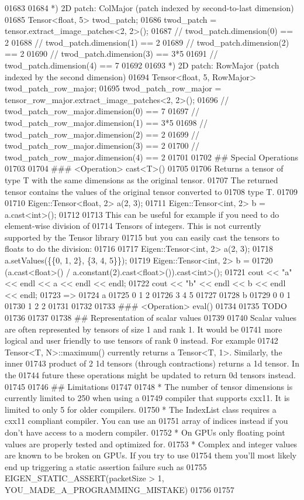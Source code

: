 \begin{DoxyCode}
01683 
01684 *) 2D patch: ColMajor (patch indexed by second-to-last dimension)
01685   Tensor<float, 5> twod\_patch;
01686   twod\_patch = tensor.extract\_image\_patches<2, 2>();
01687   // twod\_patch.dimension(0) == 2
01688   // twod\_patch.dimension(1) == 2
01689   // twod\_patch.dimension(2) == 2
01690   // twod\_patch.dimension(3) == 3*5
01691   // twod\_patch.dimension(4) == 7
01692 
01693 *) 2D patch: RowMajor (patch indexed by the second dimension)
01694   Tensor<float, 5, RowMajor> twod\_patch\_row\_major;
01695   twod\_patch\_row\_major = tensor\_row\_major.extract\_image\_patches<2, 2>();
01696   // twod\_patch\_row\_major.dimension(0) == 7
01697   // twod\_patch\_row\_major.dimension(1) == 3*5
01698   // twod\_patch\_row\_major.dimension(2) == 2
01699   // twod\_patch\_row\_major.dimension(3) == 2
01700   // twod\_patch\_row\_major.dimension(4) == 2
01701 
01702 ## Special Operations
01703 
01704 ### <Operation> cast<T>()
01705 
01706 Returns a tensor of type T with the same dimensions as the original tensor.
01707 The returned tensor contains the values of the original tensor converted to
01708 type T.
01709 
01710     Eigen::Tensor<float, 2> a(2, 3);
01711     Eigen::Tensor<int, 2> b = a.cast<int>();
01712 
01713 This can be useful for example if you need to do element-wise division of
01714 Tensors of integers.  This is not currently supported by the Tensor library
01715 but you can easily cast the tensors to floats to do the division:
01716 
01717     Eigen::Tensor<int, 2> a(2, 3);
01718     a.setValues(\{\{0, 1, 2\}, \{3, 4, 5\}\});
01719     Eigen::Tensor<int, 2> b =
01720         (a.cast<float>() / a.constant(2).cast<float>()).cast<int>();
01721     cout << "a" << endl << a << endl << endl;
01722     cout << "b" << endl << b << endl << endl;
01723     =>
01724     a
01725     0 1 2
01726     3 4 5
01727 
01728     b
01729     0 0 1
01730     1 2 2
01731 
01732 
01733 ### <Operation>     eval()
01734 
01735 TODO
01736 
01737 
01738 ## Representation of scalar values
01739 
01740 Scalar values are often represented by tensors of size 1 and rank 1. It would be
01741 more logical and user friendly to use tensors of rank 0 instead. For example
01742 Tensor<T, N>::maximum() currently returns a Tensor<T, 1>. Similarly, the inner
01743 product of 2 1d tensors (through contractions) returns a 1d tensor. In the
01744 future these operations might be updated to return 0d tensors instead.
01745 
01746 ## Limitations
01747 
01748 *   The number of tensor dimensions is currently limited to 250 when using a
01749     compiler that supports cxx11. It is limited to only 5 for older compilers.
01750 *   The IndexList class requires a cxx11 compliant compiler. You can use an
01751     array of indices instead if you don't have access to a modern compiler.
01752 *   On GPUs only floating point values are properly tested and optimized for.
01753 *   Complex and integer values are known to be broken on GPUs. If you try to use
01754     them you'll most likely end up triggering a static assertion failure such as
01755     EIGEN\_STATIC\_ASSERT(packetSize > 1, YOU\_MADE\_A\_PROGRAMMING\_MISTAKE)
01756 
01757 
\end{DoxyCode}
